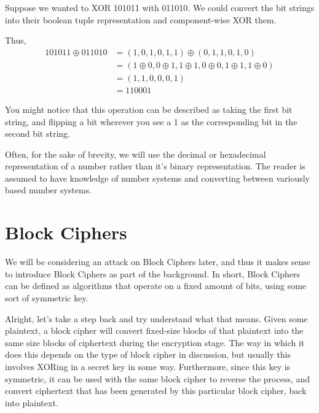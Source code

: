 \begin{example}
Suppose we wanted to XOR 101011 with 011010. We could convert the bit strings
into their boolean tuple representation and component-wise XOR them. 

Thus, 
\begin{align*}
101011 \oplus 011010 
                     &= (1, 0, 1, 0, 1, 1) \oplus (0, 1, 1, 0, 1, 0)\\ 
                     &= (1 \oplus 0, 0 \oplus 1, 1 \oplus 1, 0 \oplus 0, 1 \oplus 1, 1 \oplus 0)\\
                     &= (1, 1, 0, 0, 0, 1)\\
                     &= 110001
\end{align*}
\end{example}

You might notice that this operation can be described as taking the first bit
string, and flipping a bit wherever you see a 1 as the corresponding bit in
the second bit string.

\begin{rem}
Often, for the sake of brevity, we will use the decimal or hexadecimal 
representation of a number rather than it's binary representation. The reader
is assumed to have knowledge of number systems and converting between
variously based number systems.
\end{rem}

\section{Block Ciphers}
We will be considering an attack on Block Ciphers later, and thus it makes sense
to introduce Block Ciphers as part of the background.  In short, Block Ciphers
can be defined as algorithms that operate on a fixed amount of bits, using some
sort of symmetric key. \cite[]{handbook} 

Alright, let's take a step back and try understand what that means. Given some
plaintext, a block cipher will convert fixed-size blocks of that plaintext into
the same size blocks of ciphertext during the encryption stage. The way in which
it does this depends on the type of block cipher in discussion, but usually this
involves XORing in a secret key in some way. Furthermore, since this key is
symmetric, it can be used with the same block cipher to reverse the process, and
convert ciphertext that has been generated by this particular block cipher, back
into plaintext.

